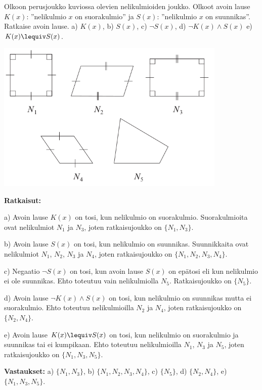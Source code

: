 \begin{esimerkki}
 Olkoon perusjoukko kuviossa olevien nelikulmioiden joukko. Olkoot avoin lause $K(x)$: ''nelikulmio $x$ on suorakulmio'' ja $S(x)$: ''nelikulmio $x$ on suunnikas''. Ratkaise avoin lause.  a)  $K(x)$,  b)  $S(x)$,  c) $\lnot S(x)$,  d)  $\lnot K(x) \land S(x)$  e)  $K(x) \lequiv S(x)$.

\begin{center}
\includegraphics[width=11cm]{pictures/kpl3_2_esim3}
\end{center}


{\bf Ratkaisut:}

a) Avoin lause $K(x)$ on tosi, kun nelikulmio on suorakulmio. Suorakulmioita ovat nelikulmiot $N_1$ ja $N_3$, joten ratkaisujoukko on $\{ N_1, N_3\}$.

b) Avoin lause $S(x)$ on tosi, kun nelikulmio on suunnikas. Suunnikkaita ovat nelikulmiot $N_1$, $N_2$, $N_3$ ja $N_4$, joten ratkaisujoukko on $\{ N_1, N_2, N_3, N_4\}$.

c) Negaatio $\lnot S(x)$ on tosi, kun avoin lause $S(x)$ on epätosi eli kun nelikulmio ei ole suunnikas. Ehto toteutuu vain nelikulmiolla $N_5$. Ratkaisujoukko on $\{N_5\}$.

d) Avoin lause $\lnot K(x) \land S(x)$ on tosi, kun nelikulmio on suunnikas mutta ei suorakulmio. Ehto toteutuu nelikulmioilla $N_2$ ja $N_4$, joten ratkaisujoukko on $\{ N_2, N_4\}$.

e) Avoin lause $K(x) \lequiv S(x)$ on tosi, kun nelikulmio on suorakulmio ja suunnikas tai ei kumpikaan. Ehto toteutuu nelikulmioilla $N_1$, $N_3$ ja $N_5$, joten ratkaisujoukko on $\{ N_1, N_3, N_5\}$.

{\bf Vastaukset:}   a)  $\{ N_1, N_3\}$,   b)  $\{ N_1, N_2, N_3, N_4\}$,   c)  $\{N_5\}$,  d)  $\{ N_2, N_4\}$,  e)  $\{ N_1, N_3, N_5\}$.
\end{esimerkki}

